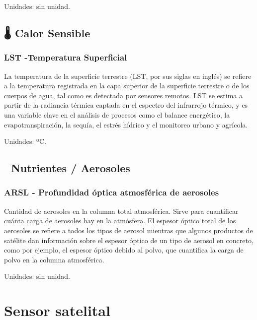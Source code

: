 \documentclass[
]{book}
\begin{document}
Unidades: sin unidad.

\section{\texorpdfstring{\textbf{🌡️ Calor Sensible}}{🌡️ Calor Sensible}}\label{calor-sensible}

\subsection{\texorpdfstring{\textbf{LST} -Temperatura Superficial}{LST -Temperatura Superficial}}\label{lst--temperatura-superficial}

La temperatura de la superficie terrestre (LST, por sus siglas en inglés) se refiere a la temperatura registrada en la capa superior de la superficie terrestre o de los cuerpos de agua, tal como es detectada por sensores remotos. LST se estima a partir de la radiancia térmica captada en el espectro del infrarrojo térmico, y es una variable clave en el análisis de procesos como el balance energético, la evapotranspiración, la sequía, el estrés hídrico y el monitoreo urbano y agrícola.

Unidades: ºC.

\section{\texorpdfstring{\textbf{💨 Nutrientes / Aerosoles}}{💨 Nutrientes / Aerosoles}}\label{nutrientes-aerosoles}

\subsection{\texorpdfstring{\textbf{ARSL} - Profundidad óptica atmosférica de aerosoles}{ARSL - Profundidad óptica atmosférica de aerosoles}}\label{arsl---profundidad-uxf3ptica-atmosfuxe9rica-de-aerosoles}

Cantidad de aerosoles en la columna total atmosférica. Sirve para cuantificar cuánta carga de aerosoles hay en la atmósfera. El espesor óptico total de los aerosoles se refiere a todos los tipos de aerosol mientras que algunos productos de satélite dan información sobre el espesor óptico de un tipo de aerosol en concreto, como por ejemplo, el espesor óptico debido al polvo, que cuantifica la carga de polvo en la columna atmosférica.

Unidades: sin unidad.

\chapter{Sensor satelital}\label{sensor}
\end{document}
